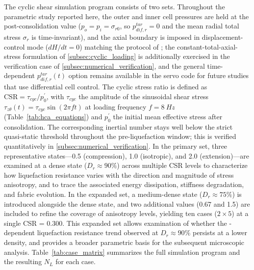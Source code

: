 The cyclic shear simulation program consists of two sets. Throughout the parametric \Kzero{} study reported here, the outer and inner cell pressures are held at the post-consolidation value ($p_o=p_i=\sigma_{r0}$, so $p_{dif,r}^{tar}=0$ and the mean radial total stress $\sigma_r$ is time-invariant), and the axial boundary is imposed in displacement-control mode ($dH/dt=0$) matching the protocol of \citet{Ishihara1985}; the constant-total-axial-stress formulation of \cref{subsec:cyclic_loading} is additionally exercised in the verification case of \cref{subsec:numerical_verification}, and the general time-dependent $p_{dif,r}^{tar}(t)$ option remains available in the servo code for future studies that use differential cell control. The cyclic stress ratio is defined as $\mathrm{CSR} = \tau_{cyc}/p_0^{\prime}$, with $\tau_{cyc}$ the amplitude of the sinusoidal shear stress $\tau_{z\theta}(t) = \tau_{cyc}\sin(2\pi f t)$ at loading frequency $f = \SI{8}{Hz}$ (Table~\ref{tab:hca_equations}) and $p_0^{\prime}$ the initial mean effective stress after consolidation. The corresponding inertial number stays well below the strict quasi-static threshold throughout the pre-liquefaction window; this is verified quantitatively in \cref{subsec:numerical_verification}. In the primary set, three representative \Kzero{} states---0.5 (compression), 1.0 (isotropic), and 2.0 (extension)---are examined at a dense state ($D_r \approx 90\%$) across multiple CSR levels to characterize how liquefaction resistance varies with the direction and magnitude of stress anisotropy, and to trace the associated energy dissipation, stiffness degradation, and fabric evolution. In the expanded set, a medium-dense state ($D_r \approx 75\%$) is introduced alongside the dense state, and two additional \Kzero{} values (0.67 and 1.5) are included to refine the coverage of anisotropy levels, yielding ten cases ($2 \times 5$) at a single CSR = 0.300. This expanded set allows examination of whether the \Kzero{}-dependent liquefaction resistance trend observed at $D_r \approx 90\%$ persists at a lower density, and provides a broader parametric basis for the subsequent microscopic analysis. Table~\ref{tab:case_matrix} summarizes the full simulation program and the resulting $N_L$ for each case.

